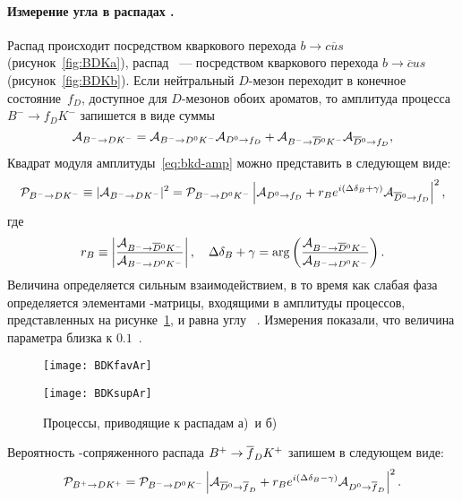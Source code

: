 \paragraph{\boldmath Измерение угла \gphi в распадах \bdk.} Распад \bdnkm происходит посредством кваркового перехода $b\to c\overline{u}s$ (рисунок~\ref{fig:BDKa}),  распад \bdbkm\ --- посредством кваркового перехода $b\to\overline{c}us$ (рисунок~\ref{fig:BDKb}).  Если нейтральный $D$-мезон переходит в конечное состояние~$f_D$, доступное для $D$-мезонов обоих ароматов, то  амплитуда процесса $B^-\to f_DK^-$ запишется в виде суммы
\begin{equation}\label{eq:bkd-amp}
 \mathcal{A}_{B^-\to D K^-} = \mathcal{A}_{B^-\to D^0 K^-}\mathcal{A}_{D^0\to f_D} + \mathcal{A}_{B^-\to\overline{D}{}^0 K^-}\mathcal{A}_{\overline{D}{}^0\to f_D},
\end{equation}
Квадрат модуля амплитуды~\eqref{eq:bkd-amp} можно представить в следующем виде:
\begin{equation}\label{eq:p_bdkm}
 \mathcal{P}_{B^-\to D K^-} \equiv |\mathcal{A}_{B^-\to D K^-}|^2 = 
 \mathcal{P}_{B^-\to D^0 K^-}\left|\mathcal{A}_{D^0\to f_D} + r_B e^{i\left( \Delta\delta_B+\gamma \right)}\mathcal{A}_{\overline{D}{}^0\to f_D}\right|^2,
\end{equation}
где
\begin{equation}\label{eq:rb_deltab}
  r_B \equiv \left|\frac{\mathcal{A}_{B^-\to\overline{D}{}^0 K^-}}{\mathcal{A}_{B^-\to D^0 K^-}}\right|,\quad
  \Delta\delta_B+\gamma = \arg\left(\frac{\mathcal{A}_{B^-\to\overline{D}{}^0 K^-}}{\mathcal{A}_{B^-\to D^0 K^-}}\right).
\end{equation}
Величина \delb определяется сильным взаимодействием, в то время как слабая фаза определяется элементами \ckm-матрицы, входящими в амплитуды процессов, представленных на рисунке~\ref{fig:BDK}, и равна углу \gphi~\ut.  Измерения показали, что величина параметра \rb близка к $0.1$~\cite{lhcb_gamma_binned_dalitz,belle_gamma_dalitz_model,babar_gamma_dalitz_model}.

\begin{figure}[htb]
 \begin{minipage}[b]{0.5\textwidth}
  \centering
  \texttt{[image: BDKfavAr]}
  \subcaption{}
  \label{fig:BDKa}
 \end{minipage}
 \begin{minipage}[b]{0.5\textwidth}
  \centering
  \texttt{[image: BDKsupAr]}
  \subcaption{}
  \label{fig:BDKb}
 \end{minipage}
  \caption{Процессы, приводящие к распадам а)~\bdnkm и б)~\bdbkm}
  \label{fig:BDK}
\end{figure}

Вероятность \cpconj-сопряженного распада $B^+\to\overline{f}_DK^+$ запишем в следующем виде:
\begin{equation}\label{eq:p_bdkp}
 \mathcal{P}_{B^+\to D K^+} = \mathcal{P}_{B^-\to D^0 K^-}\left|\mathcal{A}_{\overline{D}{}^0\to\overline{f}_D} + r_B e^{i\left( \Delta\delta_B-\gamma\right)}\mathcal{A}_{D^0\to\overline{f}_D}\right|^2.
\end{equation}

